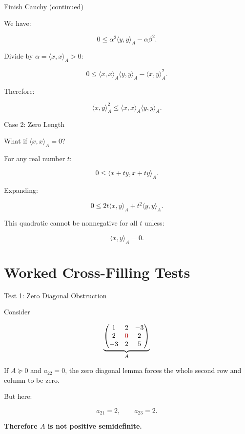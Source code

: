 \documentclass[10pt]{beamer}
\theoremstyle{definition}
\newcommand{\x}[1]{\alert{\textbf{#1}}}
\newcommand{\rd}[1]{{\color{red!70!black}#1}}
\begin{document}
\begin{frame}{Finish Cauchy (continued)}

We have:

$$
0\le
\alpha^2\langle y,y\rangle_A-\alpha\beta^2.
$$

\vfill

Divide by $\alpha=\langle x,x\rangle_A>0$:

$$
0\le \langle x,x\rangle_A\langle y,y\rangle_A-\langle x,y\rangle_A^2.
$$

\vfill

Therefore:

$$
\boxed{
\langle x,y\rangle_A^2
\le
\langle x,x\rangle_A\langle y,y\rangle_A.
}
$$

\end{frame}


\begin{frame}{Case 2: Zero Length}

What if $\langle x,x\rangle_A=0$?

\vspace{0.25cm}

For any real number $t$:

$$
0\le \langle x+ty,x+ty\rangle_A.
$$

\vspace{0.2cm}

Expanding:

$$
0\le
2t\langle x,y\rangle_A+t^2\langle y,y\rangle_A.
$$

This quadratic cannot be nonnegative for all $t$ unless:

$$
\boxed{\langle x,y\rangle_A=0.}
$$

\end{frame}


\section{Worked Cross-Filling Tests}

\begin{frame}{Test 1: Zero Diagonal Obstruction}

Consider

\[
\underbrace{
\begin{pmatrix}
1&2&-3\\
2&\rd{0}&2\\
-3&2&5
\end{pmatrix}}_{A}
\]

\vfill

If $A\succeq0$ and $a_{22}=0$, the zero diagonal lemma forces the whole second row and column to be zero.

\vfill

But here:

$$
a_{21}=2,\qquad a_{23}=2.
$$

\vfill

\begin{center}
\x{Therefore $A$ is not positive semidefinite.}
\end{center}

\end{frame}
\end{document}
